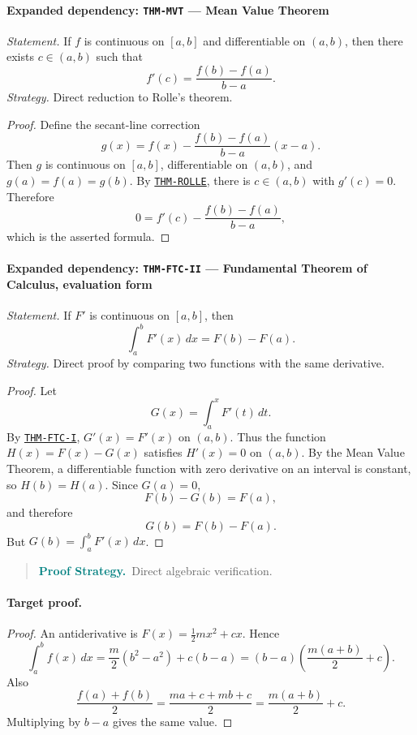\documentclass[10pt]{article}
\newcommand{\pidraw}[1]{\begingroup\urlstyle{tt}\nolinkurl{#1}\endgroup}
\newcommand{\pidref}[1]{\hyperref[prf:#1]{\pidraw{#1}}}
\newcommand{\pid}[1]{\pidref{#1}}
\theoremstyle{definition}
\theoremstyle{remark}
\newenvironment{proofstrategy}
{\begin{quote}\small\noindent\textbf{\textcolor{teal}{Proof Strategy.}}\ }
{\end{quote}}
\begin{document}
\paragraph{Expanded dependency: \pidraw{THM-MVT} --- Mean Value Theorem}
\textit{Statement.} If $f$ is continuous on $[a,b]$ and differentiable on $(a,b)$, then there exists $c\in(a,b)$ such that
\[
f'(c)=\frac{f(b)-f(a)}{b-a}.
\]
\textit{Strategy.} Direct reduction to Rolle's theorem.
\begin{proof}Define the secant-line correction
\[
g(x)=f(x)-\frac{f(b)-f(a)}{b-a}(x-a).
\]
Then $g$ is continuous on $[a,b]$, differentiable on $(a,b)$, and
$g(a)=f(a)=g(b)$. By \pid{THM-ROLLE}, there is $c\in(a,b)$ with $g'(c)=0$.
Therefore
\[
0=f'(c)-\frac{f(b)-f(a)}{b-a},
\]
which is the asserted formula.\end{proof}

\paragraph{Expanded dependency: \pidraw{THM-FTC-II} --- Fundamental Theorem of Calculus, evaluation form}
\textit{Statement.} If $F'$ is continuous on $[a,b]$, then
\[
\int_a^b F'(x)\,dx=F(b)-F(a).
\]
\textit{Strategy.} Direct proof by comparing two functions with the same derivative.
\begin{proof}Let
\[
G(x)=\int_a^x F'(t)\,dt.
\]
By \pid{THM-FTC-I}, $G'(x)=F'(x)$ on $(a,b)$. Thus the function
$H(x)=F(x)-G(x)$ satisfies $H'(x)=0$ on $(a,b)$. By the Mean Value Theorem,
a differentiable function with zero derivative on an interval is constant, so
$H(b)=H(a)$. Since $G(a)=0$,
\[
F(b)-G(b)=F(a),
\]
and therefore
\[
G(b)=F(b)-F(a).
\]
But $G(b)=\int_a^b F'(x)\,dx$.\end{proof}

\begin{proofstrategy}Direct algebraic verification.\end{proofstrategy}

\paragraph{Target proof.}

\begin{proof}

An antiderivative is $F(x)=\tfrac12mx^2+cx$. Hence
\[
\int_a^b f(x)\,dx
=
\frac{m}{2}(b^2-a^2)+c(b-a)
=
(b-a)\left(\frac{m(a+b)}2+c\right).
\]
Also
\[
\frac{f(a)+f(b)}2
=
\frac{ma+c+mb+c}{2}
=
\frac{m(a+b)}2+c.
\]
Multiplying by $b-a$ gives the same value.

\end{proof}
\end{document}

